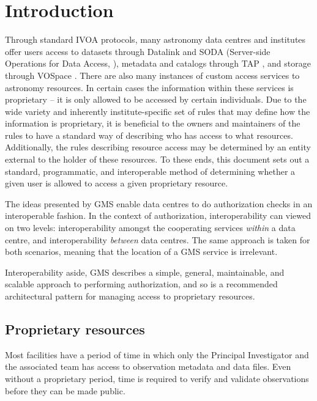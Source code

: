 \documentclass[11pt,a4paper]{ivoa}
\begin{document}
\section{Introduction}

Through standard IVOA protocols, many astronomy data centres and institutes offer users access to datasets through Datalink \citep{2015ivoa.spec.0617D} and SODA (Server-side Operations for Data Access, \citet{2017ivoa.spec.0517B}), metadata and catalogs through TAP \citep{2010ivoa.spec.0327D}, and storage through VOSpace \citep{2018ivoa.spec.0621G}.  There are also many instances of custom access services to astronomy resources.  In certain cases the information within these services is proprietary -- it is only allowed to be accessed by certain individuals.  Due to the wide variety and inherently institute-specific set of rules that may define how the information is proprietary, it is beneficial to the owners and maintainers of the rules to have a standard way of describing who has access to what resources.  Additionally, the rules describing resource access may be determined by an entity external to the holder of these resources.  To these ends, this document sets out a standard, programmatic, and interoperable method of determining whether a given user is allowed to access a given proprietary resource.

The ideas presented by GMS enable data centres to do authorization checks in an interoperable fashion.  In the context of authorization, interoperability can viewed on two levels:  interoperability amongst the cooperating services \emph{within} a data centre, and interoperability \emph{between} data centres.  The same approach is taken for both scenarios, meaning that the location of a GMS service is irrelevant.

Interoperability aside, GMS describes a simple, general, maintainable, and scalable approach to performing authorization, and so is a recommended architectural pattern for managing access to proprietary resources.

\subsection{Proprietary resources}
\label{subsec:propresources}

Most facilities have a period of time in which only the Principal Investigator and the associated team has access to observation metadata and data files.  Even without a proprietary period, time is required to verify and validate observations before they can be made public.
\end{document}

